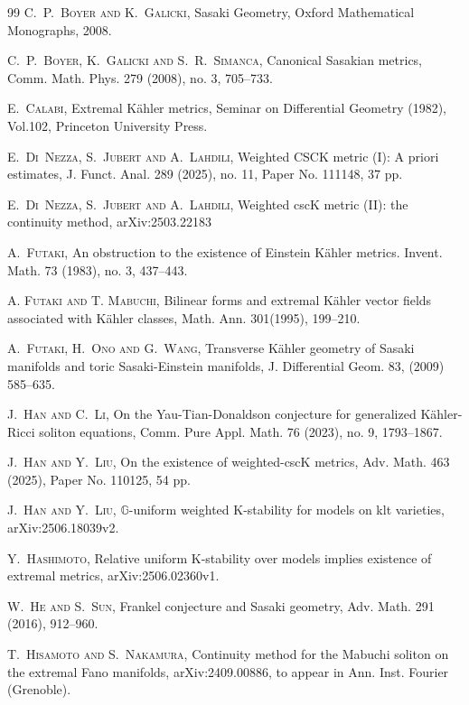 \documentclass[12pt]{amsart}
\numberwithin{equation}{section}%
\theoremstyle{plain}
\theoremstyle{definition}
\newcommand{\1}{\mathbf{1}}
\begin{document}
\begin{thebibliography}{99}
\textsc{C.~P.~Boyer and K.~Galicki}, 
Sasaki Geometry,
Oxford Mathematical Monographs, 2008.

\textsc{C.~P.~Boyer, K.~Galicki and S.~R.~Simanca},
Canonical Sasakian metrics,
Comm. Math. Phys. 279 (2008), no. 3, 705--733.

\textsc{E.~Calabi},
Extremal K\"ahler metrics, Seminar on Differential Geometry
(1982), Vol.102, Princeton University Press.

\textsc{E.~Di~Nezza, S.~Jubert and A.~Lahdili},
Weighted CSCK metric (I): A priori estimates,
J. Funct. Anal. 289 (2025), no. 11, Paper No. 111148, 37 pp.

\textsc{E.~Di~Nezza, S.~Jubert and A.~Lahdili},
Weighted cscK metric (II): the continuity method,
arXiv:2503.22183

\textsc{A.~Futaki},
An obstruction to the existence of Einstein K\"ahler metrics.
Invent. Math. 73 (1983), no. 3, 437--443.

\textsc{A. Futaki and T. Mabuchi}, 
Bilinear forms and extremal K\"{a}hler vector fields associated with
K\"{a}hler classes,
Math. Ann. 301(1995), 199--210.

\textsc{A.~Futaki, H.~Ono and G.~Wang},
Transverse K\"ahler geometry of Sasaki manifolds
and toric Sasaki-Einstein manifolds,
J. Differential Geom. 83, (2009) 585--635.

\textsc{J.~Han and C.~Li},
On the Yau-Tian-Donaldson conjecture for generalized K\"{a}hler-Ricci
soliton equations,
Comm. Pure Appl. Math. 76 (2023), no. 9, 1793--1867.

\textsc{J.~Han and Y.~Liu},
On the existence of weighted-cscK metrics,
Adv. Math. 463 (2025), Paper No. 110125, 54 pp.

\textsc{J.~Han and Y.~Liu},
$\mathbb{G}$-uniform weighted K-stability for models on klt varieties,
arXiv:2506.18039v2.

\textsc{Y.~Hashimoto},
Relative uniform K-stability over models implies existence of extremal metrics,
arXiv:2506.02360v1.

\textsc{W.~He and S.~Sun},
Frankel conjecture and Sasaki geometry,
Adv. Math. 291 (2016), 912--960.

\textsc{T.~Hisamoto and S.~Nakamura},
Continuity method for the Mabuchi soliton on the extremal Fano manifolds,
arXiv:2409.00886, to appear in Ann. Inst. Fourier (Grenoble).


\end{thebibliography}
\end{document}
